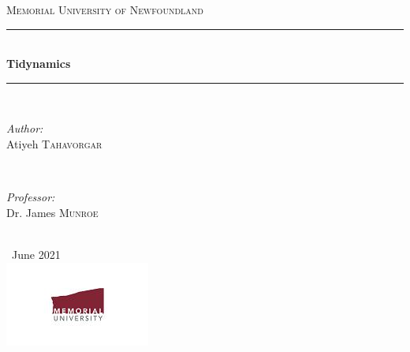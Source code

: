 \documentclass[12pt, a4paper, twoside]{report}
\begin{document}
\begin{titlepage}

\newcommand{\HRule}{\rule{\linewidth}{0.5mm}} 

\center 
 

\textsc{\large Memorial University of Newfoundland}\\[1.5cm] 


\HRule \\[0.4cm]
{ \huge \bfseries Tidynamics}\\[0.4cm] 
\HRule \\[1.5cm]
 

\begin{minipage}{0.4\textwidth}
\begin{flushleft} \large
\emph{Author:}\\
Atiyeh \textsc{Tahavorgar}
\end{flushleft}
\end{minipage}
~
\begin{minipage}{0.4\textwidth}
\begin{flushright} \large
\emph{Professor:} \\
Dr. James \textsc{Munroe} 

\end{flushright}
\end{minipage}\\[2cm]
{\normalsize \ June 2021}\\[2cm]


\includegraphics{Memorial-University-of-Newfoundland5.jpeg}\\[1cm] 

\end{titlepage}



\end{document}
